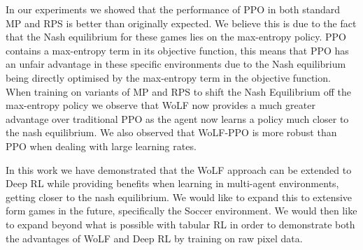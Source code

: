 \documentclass[conference]{IEEEtran}
\begin{document}
In our experiments we showed that the performance of PPO in both standard MP and RPS is better than originally expected. We believe this is due to the fact that the Nash equilibrium for these games lies on the max-entropy policy. PPO contains a max-entropy term in its objective function, this means that PPO has an unfair advantage in these specific environments due to the Nash equilibrium being directly optimised by the max-entropy term in the objective function. When training on variants of MP and RPS to shift the Nash Equilibrium off the max-entropy policy we observe that WoLF now provides a much greater advantage over traditional PPO as the agent now learns a policy much closer to the nash equilibrium. We also observed that WoLF-PPO is more robust than PPO when dealing with large learning rates.

In this work we have demonstrated that the WoLF approach can be extended to Deep RL while providing benefits when learning in multi-agent environments, getting closer to the nash equilibrium. We would like to expand this to extensive form games in the future, specifically the Soccer environment. We would then like to expand beyond what is possible with tabular RL in order to demonstrate both the advantages of WoLF and Deep RL by training on raw pixel data.
\end{document}
